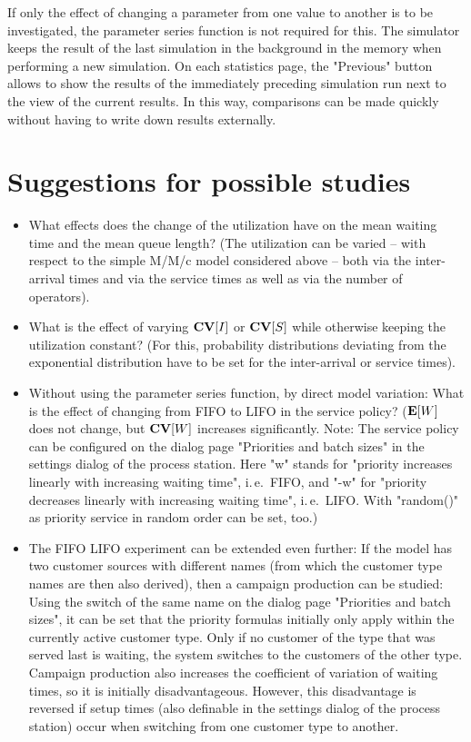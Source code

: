 \documentclass{svmono}
\begin{document}
If only the effect of changing a parameter from one value to another is to be investigated, the parameter series function is not required for this. The simulator keeps the result of the last simulation in the background in the memory when performing a new simulation. On each statistics page, the "Previous" button allows to show the results of the immediately preceding simulation run next to the view of the current results. In this way, comparisons can be made quickly without having to write down results externally.



\section{Suggestions for possible studies}

\begin{itemize}
\item
What effects does the change of the utilization have on the mean waiting time and the mean queue length? (The utilization can be varied -- with respect to the simple M/M/c model considered above -- both via the inter-arrival times and via the service times as well as via the number of operators).
\item
What is the effect of varying ${\bf CV}[I]$ or ${\bf CV}[S]$ while otherwise keeping the utilization constant? (For this, probability distributions deviating from the exponential distribution have to be set for the inter-arrival or service times).
\item
Without using the parameter series function, by direct model variation: What is the effect of changing from FIFO to LIFO in the service policy? (${\bf E}[W]$ does not change, but ${\bf CV}[W]$ increases significantly. Note: The service policy can be configured on the dialog page "Priorities and batch sizes" in the settings dialog of the process station. Here "w" stands for "priority increases linearly with increasing waiting time", i.\,e.\ FIFO, and "-w" for "priority decreases linearly with increasing waiting time", i.\,e.\ LIFO. With "random()" as priority service in random order can be set, too.)
\item
The FIFO LIFO experiment can be extended even further: If the model has two customer sources with different names (from which the customer type names are then also derived), then a campaign production can be studied: Using the switch of the same name on the dialog page "Priorities and batch sizes", it can be set that the priority formulas initially only apply within the currently active customer type. Only if no customer of the type that was served last is waiting, the system switches to the customers of the other type. Campaign production also increases the coefficient of variation of waiting times, so it is initially disadvantageous. However, this disadvantage is reversed if setup times (also definable in the settings dialog of the process station) occur when switching from one customer type to another.

\end{itemize}
\end{document}
